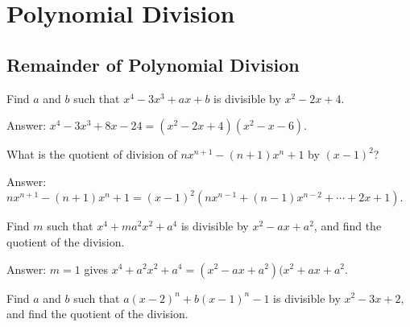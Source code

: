 \section{Polynomial Division}

\subsection{Remainder of Polynomial Division}


\begin{tcolorbox}
\begin{question}
Find $a$ and $b$ such that $x^4-3x^3+ax+b$ is divisible by $x^2-2x+4$.
\end{question}
\end{tcolorbox}

\begin{solution}[name=Solution by Parviz Shahriari]
Answer: $x^4-3x^3+8x-24 = (x^2-2x+4)(x^2-x-6)$.
\end{solution}

\begin{tcolorbox}
\begin{question}
What is the quotient of division of $nx^{n+1}-(n+1)x^n+1$ by $(x-1)^2$?
\end{question}
\end{tcolorbox}

\begin{solution}[name=Solution by Parviz Shahriari]
Answer: $nx^{n+1}-(n+1)x^n+1 = (x-1)^2\left(nx^{n-1}+(n-1)x^{n-2}+\cdots+2x+1\right)$.
\end{solution}


\begin{tcolorbox}
\begin{question}
Find $m$ such that $x^4+ma^2x^2+a^4$ is divisible by $x^2-ax+a^2$, and find the quotient of the division.
\end{question}
\end{tcolorbox}

\begin{solution}[name=Solution by Parviz Shahriari]
Answer: $m=1$ gives $x^4+a^2x^2+a^4 = (x^2-ax+a^2)(x^2+ax+a^2$.
\end{solution}



\begin{tcolorbox}
\begin{question}
Find $a$ and $b$ such that $a(x-2)^n+b(x-1)^n-1$ is divisible by $x^2-3x+2$, and find the quotient of the division.
\end{question}
\end{tcolorbox}


